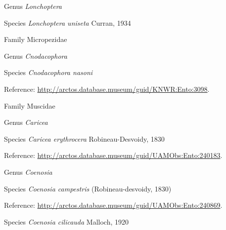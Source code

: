 \documentclass[9pt, article]{memoir}
\begin{document}
\begin{multicols}{2}
\vspace{6pt}\noindent\hspace{30pt}Genus \textit{Lonchoptera}


\vspace{6pt}\noindent\hspace{36pt}Species \textit{Lonchoptera uniseta} Curran, 1934


\vspace{6pt}\noindent\hspace{24pt}Family Micropezidae


\vspace{6pt}\noindent\hspace{30pt}Genus \textit{Cnodacophora}


\vspace{6pt}\noindent\hspace{36pt}Species \textit{Cnodacophora nasoni}


\vspace{6pt}Reference: 
\url{http://arctos.database.museum/guid/KNWR:Ento:3098}.

\vspace{6pt}\noindent\hspace{24pt}Family Muscidae


\vspace{6pt}\noindent\hspace{30pt}Genus \textit{Caricea}


\vspace{6pt}\noindent\hspace{36pt}Species \textit{Caricea erythrocera} Robineau-Desvoidy, 1830


\vspace{6pt}Reference: 
\url{http://arctos.database.museum/guid/UAMObs:Ento:240183}.

\vspace{6pt}\noindent\hspace{30pt}Genus \textit{Coenosia}


\vspace{6pt}\noindent\hspace{36pt}Species \textit{Coenosia campestris} (Robineau-desvoidy, 1830)


\vspace{6pt}Reference: 
\url{http://arctos.database.museum/guid/UAMObs:Ento:240869}.

\vspace{6pt}\noindent\hspace{36pt}Species \textit{Coenosia cilicauda} Malloch, 1920



\end{multicols}
\end{document}
